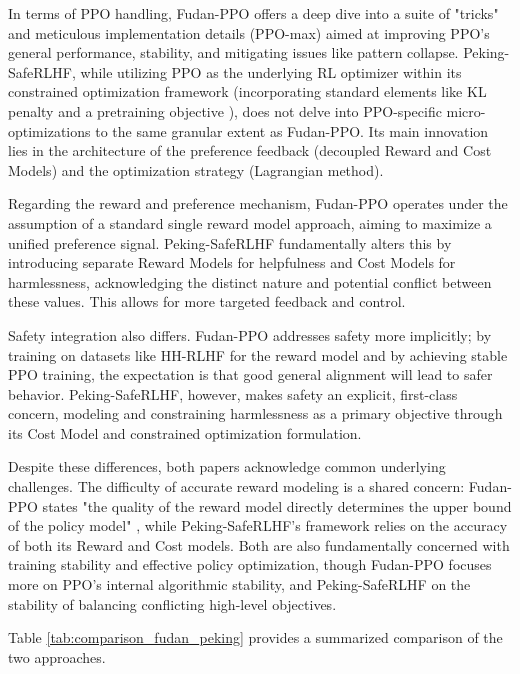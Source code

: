\documentclass{article} %
\begin{document}
In terms of PPO handling, Fudan-PPO offers a deep dive into a suite of "tricks" and meticulous implementation details (PPO-max) aimed at improving PPO's general performance, stability, and mitigating issues like pattern collapse. Peking-SafeRLHF, while utilizing PPO as the underlying RL optimizer within its constrained optimization framework (incorporating standard elements like KL penalty and a pretraining objective \cite{Dai2023SafeRLHF}), does not delve into PPO-specific micro-optimizations to the same granular extent as Fudan-PPO. Its main innovation lies in the architecture of the preference feedback (decoupled Reward and Cost Models) and the optimization strategy (Lagrangian method).

Regarding the reward and preference mechanism, Fudan-PPO operates under the assumption of a standard single reward model approach, aiming to maximize a unified preference signal. Peking-SafeRLHF fundamentally alters this by introducing separate Reward Models for helpfulness and Cost Models for harmlessness, acknowledging the distinct nature and potential conflict between these values. This allows for more targeted feedback and control.

Safety integration also differs. Fudan-PPO addresses safety more implicitly; by training on datasets like HH-RLHF for the reward model \cite{Zheng2023PPO} and by achieving stable PPO training, the expectation is that good general alignment will lead to safer behavior. Peking-SafeRLHF, however, makes safety an explicit, first-class concern, modeling and constraining harmlessness as a primary objective through its Cost Model and constrained optimization formulation.

Despite these differences, both papers acknowledge common underlying challenges. The difficulty of accurate reward modeling is a shared concern: Fudan-PPO states "the quality of the reward model directly determines the upper bound of the policy model" \cite{Zheng2023PPO}, while Peking-SafeRLHF's framework relies on the accuracy of both its Reward and Cost models. Both are also fundamentally concerned with training stability and effective policy optimization, though Fudan-PPO focuses more on PPO's internal algorithmic stability, and Peking-SafeRLHF on the stability of balancing conflicting high-level objectives.

Table \ref{tab:comparison_fudan_peking} provides a summarized comparison of the two approaches.
\end{document}
